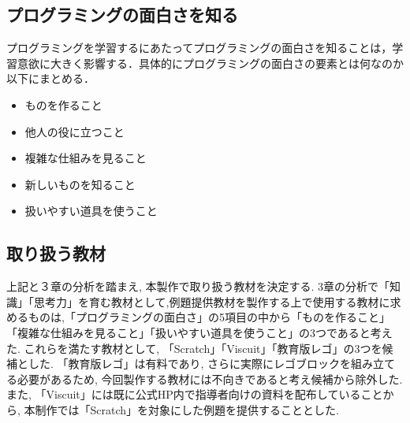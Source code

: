 \subsection{プログラミングの面白さを知る}
プログラミングを学習するにあたってプログラミングの面白さを知ることは，学習意欲に大きく影響する．具体的にプログラミングの面白さの要素とは何なのか以下にまとめる．
\begin{itemize}
\item ものを作ること\\
\item 他人の役に立つこと\\
\item 複雑な仕組みを見ること\\
\item 新しいものを知ること\\
\item 扱いやすい道具を使うこと
\end{itemize}

\subsection{取り扱う教材}
上記と３章の分析を踏まえ, 本製作で取り扱う教材を決定する. 3章の分析で「知識」「思考力」を育む教材として,例題提供教材を製作する上で使用する教材に求めるものは,「プログラミングの面白さ」の5項目の中から「ものを作ること」「複雑な仕組みを見ること」「扱いやすい道具を使うこと」の3つであると考えた. これらを満たす教材として, 「Scratch」「Viscuit」「教育版レゴ」の3つを候補とした.  「教育版レゴ」は有料であり, さらに実際にレゴブロックを組み立てる必要があるため, 今回製作する教材には不向きであると考え候補から除外した. また, 「Viscuit」には既に公式HP内で指導者向けの資料を配布していることから,  本制作では「Scratch」を対象にした例題を提供することとした.